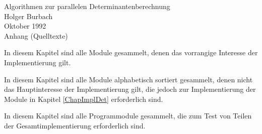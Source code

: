 %
%
\begin{appendix}
\sloppy
\thispagestyle{empty}
\vspace*{6cm}
\begin{center}
   \LARGE
   Algorithmen zur parallelen Determinantenberechnung \\[1cm]
   \Large
   Holger Burbach \\[1cm]
   Oktober 1992 \\[1.5cm]
   \LARGE Anhang (Quelltexte)
\end{center}

\label{ChapImplDet}

In diesem Kapitel sind alle Module gesammelt, denen das vorrangige
Interesse der Implementierung gilt.









\label{ChapSupport}

In diesem Kapitel sind alle Module alphabetisch sortiert gesammelt,
denen nicht das Hauptinteresse der Implementierung gilt, die jedoch zur
Implementierung der Module in Kapitel \ref{ChapImplDet} erforderlich
sind.





































\label{ChapTest}

In diesem Kapitel sind alle Programmodule gesammelt, die zum Test von
Teilen der Gesamtimplementierung erforderlich sind.







\end{appendix}

